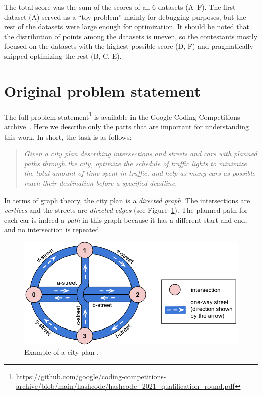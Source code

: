 The total score was the sum of the scores of all 6 datasets (A--F). The first dataset (A) served as a ``toy problem'' mainly for debugging purposes, but the rest of the datasets were large enough for optimization. It should be noted that the distribution of points among the datasets is uneven, so the contestants mostly focused on the datasets with the highest possible score (D, F) and pragmatically skipped optimizing the rest (B, C, E).

\section{Original problem statement} \label{sec:original_problem_statement}

The full problem statement\footnote{\url{https://github.com/google/coding-competitions-archive/blob/main/hashcode/hashcode_2021_qualification_round.pdf}} is available in the Google Coding Competitions archive~\cite{google2023google}. Here we describe only the parts that are important for understanding this work.
In short, the task is as follows:
\begin{quote}
    \textit{Given a city plan describing intersections and streets and cars with planned paths through the city, optimize the schedule of traffic lights to minimize the total amount of time spent in traffic, and help as many cars as possible reach their destination before a specified deadline.}
\end{quote}
In terms of graph theory, the city plan is a \textit{directed graph}. The intersections are \textit{vertices} and the streets are \textit{directed edges} (see Figure~\ref{fig:hashcode_city_plan}). The planned path for each car is indeed a \textit{path} in this graph because it has a different start and end, and no intersection is repeated.

\begin{figure}
    \centering
    \includegraphics[width=\linewidth]{img/hashcode/figure1.png}
    \caption[Example of a city plan]{
        Example of a city plan \cite{google2023google}.
    }
    \label{fig:hashcode_city_plan}
\end{figure}

